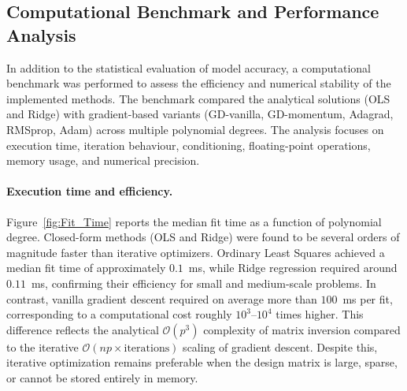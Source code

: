 \documentclass[
 reprint,            %
 amsmath,amssymb,
 aps,
]{revtex4-2}
\begin{document}
\subsection{Computational Benchmark and Performance Analysis}
\label{sec:Computational_Benchmark}


In addition to the statistical evaluation of model accuracy, a computational benchmark was performed to assess the efficiency and numerical stability of the implemented methods. 
The benchmark compared the analytical solutions (OLS and Ridge) with gradient-based variants (GD-vanilla, GD-momentum, Adagrad, RMSprop, Adam) across multiple polynomial degrees. 
The analysis focuses on execution time, iteration behaviour, conditioning, floating-point operations, memory usage, and numerical precision.

\paragraph*{Execution time and efficiency.}
Figure~\ref{fig:Fit_Time} reports the median fit time as a function of polynomial degree.
Closed-form methods (OLS and Ridge) were found to be several orders of magnitude faster than iterative optimizers.
Ordinary Least Squares achieved a median fit time of approximately $0.1$~ms, while Ridge regression required around $0.11$~ms, confirming their efficiency for small and medium-scale problems.
In contrast, vanilla gradient descent required on average more than $100$~ms per fit, corresponding to a computational cost roughly $10^3$--$10^4$ times higher.
This difference reflects the analytical $\mathcal{O}(p^3)$ complexity of matrix inversion compared to the iterative $\mathcal{O}(n p \times \text{iterations})$ scaling of gradient descent.
Despite this, iterative optimization remains preferable when the design matrix is large, sparse, or cannot be stored entirely in memory.


\end{document}
